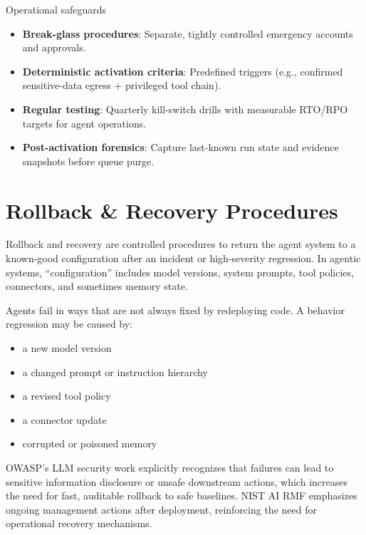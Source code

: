 \begin{TNtwocol}
    Operational safeguards
    \begin{itemize}
        \item \textbf{Break-glass procedures}: Separate, tightly controlled emergency accounts and approvals.
        \item \textbf{Deterministic activation criteria}: Predefined triggers (e.g., confirmed sensitive-data egress + privileged tool chain).
        \item \textbf{Regular testing}: Quarterly kill-switch drills with measurable RTO/RPO targets for agent operations.
        \item \textbf{Post-activation forensics}: Capture last-known run state and evidence snapshots before queue purge.
    \end{itemize}

    \section{Rollback & Recovery Procedures}

    Rollback and recovery are controlled procedures to return the agent system to a known-good configuration after an incident or high-severity regression. In agentic systems, “configuration” includes model versions, system prompts, tool policies, connectors, and sometimes memory state.

    Agents fail in ways that are not always fixed by redeploying code. A behavior regression may be caused by:

    \begin{itemize}
        \item a new model version
        \item a changed prompt or instruction hierarchy
        \item a revised tool policy
        \item a connector update
        \item corrupted or poisoned memory
    \end{itemize}

    OWASP's LLM security work explicitly recognizes that failures can lead to sensitive information disclosure or unsafe downstream actions, which increases the need for fast, auditable rollback to safe baselines.  NIST AI RMF emphasizes ongoing management actions after deployment, reinforcing the need for operational recovery mechanisms.


\end{TNtwocol}
